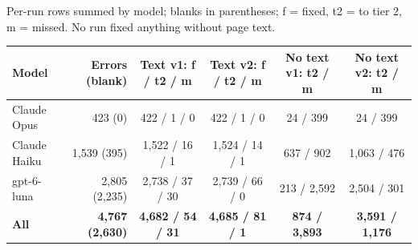 \label{tab:ho2}
Per-run rows summed by model; blanks in parentheses; f = fixed, t2 = to tier 2, m = missed. No run fixed anything without page text.
\begin{center}\footnotesize\setlength{\tabcolsep}{3pt}
\begin{tabular}{lrcccc}
\toprule
Model & Errors (blank) & Text v1: f / t2 / m & Text v2: f / t2 / m & No text v1: t2 / m & No text v2: t2 / m \\
\midrule
Claude Opus & 423 (0) & 422 / 1 / 0 & 422 / 1 / 0 & 24 / 399 & 24 / 399 \\
Claude Haiku & 1,539 (395) & 1,522 / 16 / 1 & 1,524 / 14 / 1 & 637 / 902 & 1,063 / 476 \\
gpt-6-luna & 2,805 (2,235) & 2,738 / 37 / 30 & 2,739 / 66 / 0 & 213 / 2,592 & 2,504 / 301 \\
\midrule
\textbf{All} & \textbf{4,767 (2,630)} & \textbf{4,682 / 54 / 31} & \textbf{4,685 / 81 / 1} & \textbf{874 / 3,893} & \textbf{3,591 / 1,176} \\
\bottomrule
\end{tabular}
\end{center}

